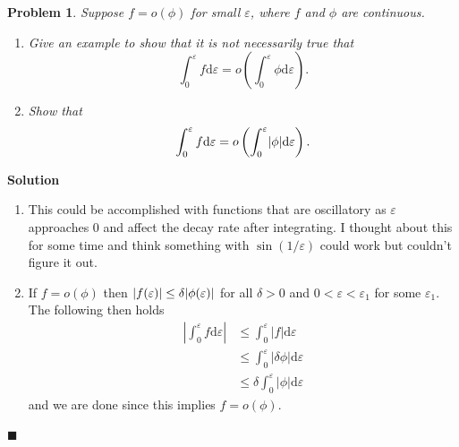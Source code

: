 \documentclass[11pt]{article}
\newcommand{\vep}{\varepsilon}
\DeclarePairedDelimiter\abs{\lvert}{\rvert}
\theoremstyle{problemstyle}
\newtheorem{problem}{Problem}
\newenvironment{solution}
  {\noindent\textbf{Solution}\quad}
  {\hfill$\blacksquare$\par\vspace{1em}}
\begin{document}
\newpage
\begin{problem}{1.5}
Suppose $f=o(\phi)$ for small $\vep$, where $f$ and $\phi$ are continuous.
\begin{enumerate}
  \item Give an example to show that it is not necessarily true that
    \[ \int_0^\vep f \mathrm{d} \vep = o\left(\int_0^\vep \phi \mathrm{d}
    \vep \right).\]
  \item Show that 
    \[ \int_0^\vep f \mathrm{d} \vep = o\left(\int_0^\vep \abs{\phi}
    \mathrm{d} \vep \right).\]
\end{enumerate}
\end{problem}

\begin{solution}
  \begin{enumerate}
    \item This could be accomplished with functions that are oscillatory as $\vep$ approaches 0 and
      affect the decay rate after integrating. I thought about this for some time and think
      something with $\sin(1/\vep)$ could work but couldn't figure it out.
    \item If $f = o(\phi)$ then $\abs{f(\vep)} \leq \delta \abs{\phi(\vep)}$ for all $\delta > 0$
      and $0 < \vep < \vep_1$ for some $\vep_1$. The following then holds
      \begin{align*}
        \left\vert \int_0^\vep f \mathrm{d}{\vep} \right\vert
          &\leq \int_0^\vep \left\vert f \right\vert \mathrm{d}{\vep} \\
          &\leq \int_0^\vep \left\vert \delta \phi \right\vert \mathrm{d}{\vep} \\
          &\leq \delta \int_0^\vep \left\vert\phi \right\vert \mathrm{d}{\vep}
      \end{align*}
      and we are done since this implies $f = o(\phi)$.
  \end{enumerate}
\end{solution}
   
\end{document}
